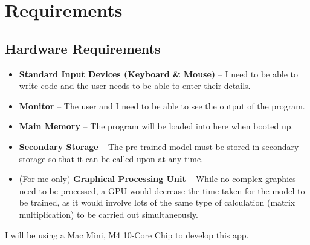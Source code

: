 \documentclass[12pt]{report}
\begin{document}
\section{Requirements}
\subsection{Hardware Requirements}
\begin{itemize}
    \item \textbf{Standard Input Devices (Keyboard \& Mouse)} -- I need to be able to write code and the user needs to be able to enter their details.
    \item \textbf{Monitor} -- The user and I need to be able to see the output of the program.
    \item \textbf{Main Memory} -- The program will be loaded into here when booted up.
    \item \textbf{Secondary Storage} -- The pre-trained model must be stored in secondary storage so that it can be called upon at any time.
    \item (For me only) \textbf{Graphical Processing Unit} -- While no complex graphics need to be processed, a GPU would decrease the time taken for the model to be trained, as it would involve lots of the same type of calculation (matrix multiplication) to be carried out simultaneously.
\end{itemize}
I will be using a Mac Mini, M4 10-Core Chip to develop this app.
\end{document}
